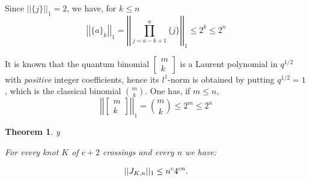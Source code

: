 \documentclass{amsart}
\newtheorem{theorem}{Theorem}[section]
\theoremstyle{definition}
\def\printname#1{
    \if\draft y
        \smash{\makebox[0pt]{\hspace{-0.5in}
            \raisebox{8pt}{\tt\tiny #1}}}
    \fi
}
\newcommand{\qbinom}[2]{\text{$\left[\begin{array}{c}#1\\ #2\end{array}
\right]$}}
\def\lbl#1{\label{#1}\printname{#1}}
\begin{document}
Since $||\{j\}||_1 =2$, we have, for $k \leq n$
\begin{equation}
\left| \left|\{a\}_k\right|\right|_1  = \left|\! \left| \prod_{j=a-k+1}^a\{ j \}\right|\!\right|_1  \leq 2^k \leq 2^n
\label{32}
\end{equation}

It is known that the quantum binomial $\qbinom{m}{k}$ is a Laurent
polynomial in $q^{1/2}$ with {\em positive} integer coefficients,
hence its $l^1$-norm is obtained by putting $q^{1/2}=1$, which is
the classical  binomial $\binom{m}{k}$. One has, if $m \leq
n$,
\begin{equation} \left|\! \left|\qbinom{m}{k}\right|\!\right|_1=\binom{m}{k} \leq 2^m \leq
2^n \label{31}
\end{equation}



\begin{theorem}
\lbl{thm.3}
For every knot $K$ of $c+2$ crossings and
every $n$ we have:

\begin{equation}
\lbl{eq.l1}
||J_{K,n}||_1 \leq n^c 4^{c n}.
\end{equation}
\end{theorem}
\end{document}
